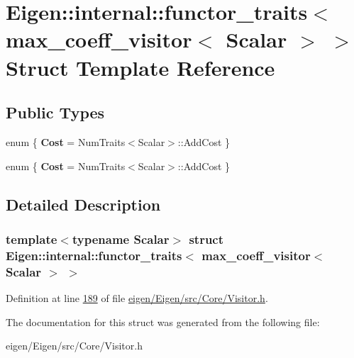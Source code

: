\hypertarget{struct_eigen_1_1internal_1_1functor__traits_3_01max__coeff__visitor_3_01_scalar_01_4_01_4}{}\section{Eigen\+:\+:internal\+:\+:functor\+\_\+traits$<$ max\+\_\+coeff\+\_\+visitor$<$ Scalar $>$ $>$ Struct Template Reference}
\label{struct_eigen_1_1internal_1_1functor__traits_3_01max__coeff__visitor_3_01_scalar_01_4_01_4}
\subsection*{Public Types}
\begin{DoxyCompactItemize}
\item 
\mbox{\label{struct_eigen_1_1internal_1_1functor__traits_3_01max__coeff__visitor_3_01_scalar_01_4_01_4_ab49d1730f31b04c5017e5f2627388395}} 
enum \{ {\bfseries Cost} = Num\+Traits$<$Scalar$>$\+:\+:Add\+Cost
 \}
\item 
\mbox{\label{struct_eigen_1_1internal_1_1functor__traits_3_01max__coeff__visitor_3_01_scalar_01_4_01_4_a80bc3df1dfe63f8772e663020e733d09}} 
enum \{ {\bfseries Cost} = Num\+Traits$<$Scalar$>$\+:\+:Add\+Cost
 \}
\end{DoxyCompactItemize}


\subsection{Detailed Description}
\subsubsection*{template$<$typename Scalar$>$\newline
struct Eigen\+::internal\+::functor\+\_\+traits$<$ max\+\_\+coeff\+\_\+visitor$<$ Scalar $>$ $>$}



Definition at line \hyperlink{eigen_2_eigen_2src_2_core_2_visitor_8h_source_l00189}{189} of file \hyperlink{eigen_2_eigen_2src_2_core_2_visitor_8h_source}{eigen/\+Eigen/src/\+Core/\+Visitor.\+h}.



The documentation for this struct was generated from the following file\+:\begin{DoxyCompactItemize}
\item 
eigen/\+Eigen/src/\+Core/\+Visitor.\+h\end{DoxyCompactItemize}
